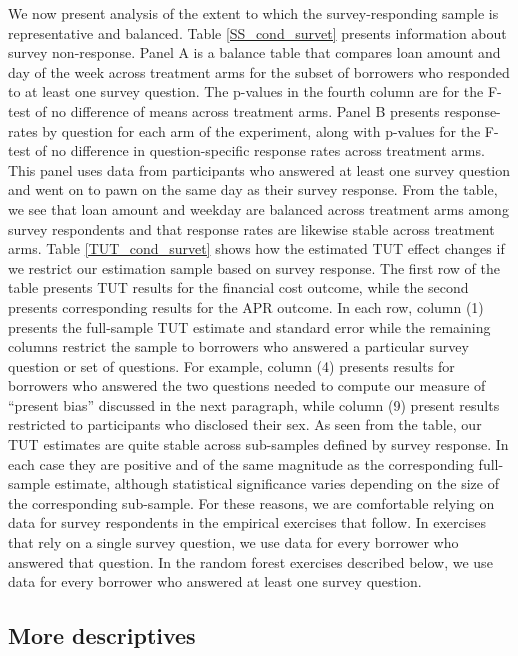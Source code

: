\newpage

We now present analysis of the extent to which the survey-responding sample is representative and balanced.
Table \ref{SS_cond_survet} presents information about survey non-response.
Panel A is a balance table that compares loan amount and day of the week across treatment arms for the subset of borrowers who responded to at least one survey question.
The p-values in the fourth column are for the F-test of no difference of means across treatment arms. 
Panel B presents response-rates by question for each arm of the experiment, along with p-values for the F-test of no difference in question-specific response rates across treatment arms. 
This panel uses data from participants who answered at least one survey question and went on to pawn on the same day as their survey response.
From the table, we see that loan amount and weekday are balanced across treatment arms among survey respondents and that response rates are likewise stable across treatment arms.
Table \ref{TUT_cond_survet} shows how the estimated TUT effect changes if we restrict our estimation sample based on survey response.
The first row of the table presents TUT results for the financial cost outcome, while the second presents corresponding results for the APR outcome.
In each row, column (1) presents the full-sample TUT estimate and standard error while the remaining columns restrict the sample to borrowers who answered a particular survey question or set of questions.
For example, column (4) presents results for borrowers who answered the two questions needed to compute our measure of ``present bias'' discussed in the next paragraph, while column (9) present results restricted to participants who disclosed their sex. 
As seen from the table, our TUT estimates are quite stable across sub-samples defined by survey response.
In each case they are positive and of the same magnitude as the corresponding full-sample estimate, although statistical significance varies depending on the size of the corresponding sub-sample. 
For these reasons, we are comfortable relying on data for survey respondents in the empirical exercises that follow.
In exercises that rely on a single survey question, we use data for every borrower who answered that question.
In the random forest exercises described below, we use data for every borrower who answered at least one survey question.



\subsection{More descriptives}


